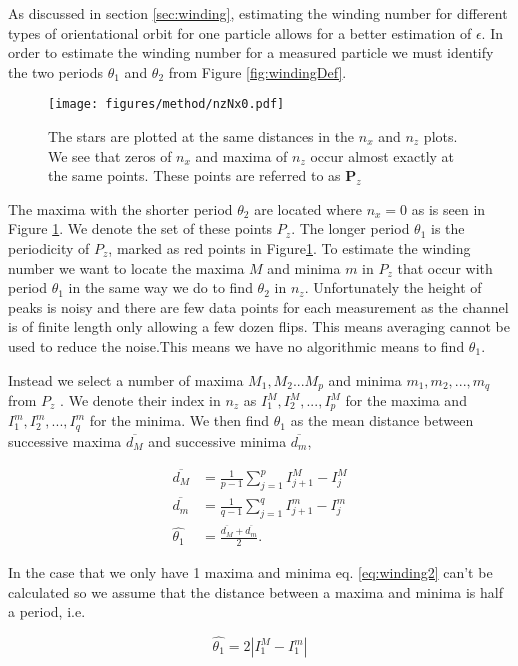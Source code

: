 	\label{sec:windingEstimation}
As discussed in section \ref{sec:winding}, estimating the winding number for different types of orientational orbit for one particle allows for a better estimation of $\epsilon$. In order to estimate the winding number for a measured 
particle we must identify the two periods $\theta_1$ and $\theta_2$ from Figure \ref{fig:windingDef}. 


\begin{figure}
\centering
\texttt{[image: figures/method/nzNx0.pdf]}
\caption{The stars are plotted at the same distances in the $n_x$ and $n_z$ plots. We see that zeros of $n_x$ and maxima of $n_z$ occur almost exactly at the same points. These points are referred to as $\mathbf{P}_z$}
\label{fig:nzNx0}
\end{figure}

The maxima with the shorter period $\theta_2$ are located where $n_x = 0$ as is seen in Figure \ref{fig:nzNx0}. We denote the set of these points $P_z$. The longer period $\theta_1$ is the periodicity of $P_z$, marked as red points in Figure\ref{fig:nzNx0}. To estimate the winding number we want to locate the maxima $M$ and minima $m$ in $P_z$ that occur with period $\theta_1$ in the same way we do to find $\theta_2$ in $n_z$. Unfortunately the height of peaks is noisy and there are few data points for each measurement as the channel is of finite length only allowing a few dozen flips. This means averaging cannot be used to reduce the noise.This means we have no algorithmic means to find $\theta_1$. 

Instead we select a number of maxima $M_1, M_2 ... M_p$ and minima $m_1, m_2, ..., m_q$ from $P_z$ . We denote their index in $n_z$ as $I^M_1, I^M_2, 
..., I^M_p$ for the maxima and $I^m_1, I^m_2, ..., I^m_q$ for the minima. We then find $\theta_1$ as the mean distance between successive maxima $\overline{d_M}$ and successive minima $\overline{d_m}$, 

\begin{align}
\overline{d_M} &= \frac{1}{p-1} \sum\limits_{j=1}^{p} I^M_{j+1} - I^M_{j} \\
\overline{d_m} &= \frac{1}{q-1} \sum\limits_{j=1}^{q} I^m_{j+1}- I^m_{j}\\
\hat{\theta_1}   &= \frac{\overline{d_M} + \overline{d_m}}{2}.
\label{eq:winding2}
\end{align}

In the case that we only have 1 maxima and minima eq. \ref{eq:winding2} can't be calculated so we assume that the distance between a maxima and minima is half a period, i.e.

\begin{equation}
\hat{\theta_1} = 2\left| I^M_1 - I^m_1 \right|
\end{equation}